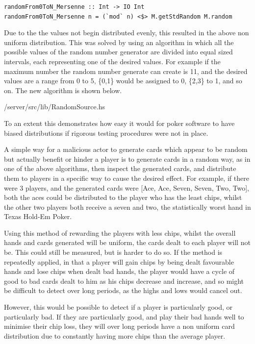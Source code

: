 \begin{lstlisting}[basicstyle=\footnotesize]
randomFrom0ToN_Mersenne :: Int -> IO Int
randomFrom0ToN_Mersenne n = (`mod` n) <$> M.getStdRandom M.random
\end{lstlisting}

Due to the the values not begin distributed evenly, this resulted in the
above non uniform distribution. This was solved by using an algorithm in which
all the possible values of the random number generator are divided into equal
sized intervals, each representing one of the desired values. For example
if the maximum number the random number generate can create is 11, and the
desired values are a range from 0 to 5, \{0,1\} would be assigned to 0, \{2,3\}
to 1, and so on. The new algorithm is shown below. \parencite{website:reich2011}
\newpage


                {\codelocation/server/src/lib/RandomSource.hs}

To an extent this demonstrates how easy it would for poker software to have
biased distributions if rigorous testing procedures were not in place.

A simple way for a malicious actor to generate cards which appear to be random
but actually benefit or hinder a player is to generate cards in a random
way, as in one of the above algorithms, then inspect the generated cards,
and distribute them to players in a specific way to cause the desired effect.
For example, if there were 3 players, and the generated cards were
[Ace, Ace, Seven, Seven, Two, Two], both the aces could be distributed to
the player who has the least chips, whilst the other two players both receive
a seven and two, the statistically worst hand in Texas Hold-Em Poker.

Using this method of rewarding the players with less chips, whilst the overall 
hands and cards generated will be uniform, the cards dealt to each player 
will not be. This could still be measured, but is harder to do so. If the
method is repeatedly applied, in that a player will gain chips by being dealt 
favourable hands and lose chips when dealt bad hands, the player would have 
a cycle of good to bad cards dealt to him as his chips decrease and increase, 
and so might be difficult to detect over long periods, as the highs and lows 
would cancel out.

However, this would be possible to detect if a player is particularly good, or
particularly bad. If they are particularly good, and play their bad hands well
to minimise their chip loss, they will over long periods have a non uniform
card distribution due to constantly having more chips than the average player.

